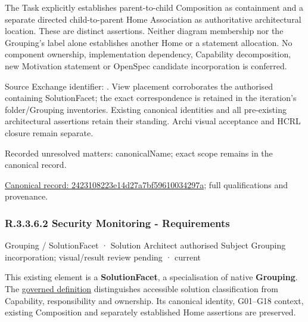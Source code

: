 The Task explicitly establishes parent-to-child Composition as containment and
a separate directed child-to-parent Home Association as authoritative architectural
location. These are distinct assertions. Neither diagram membership nor the
Grouping's label alone establishes another Home or a statement allocation.
No component ownership, implementation dependency, Capability decomposition,
new Motivation statement or OpenSpec candidate incorporation is conferred.



Source Exchange identifier: \texttt{}. View placement corroborates
the authorised containing SolutionFacet; the exact correspondence is retained in the
iteration's folder/Grouping inventories. Existing canonical identities and all
pre-existing architectural assertions retain their standing. Archi visual
acceptance and HCRL closure remain separate.


{\small Recorded unresolved matters: canonicalName; exact scope remains in the canonical record.}\par
{\footnotesize \href{../../../../../../../continuum/grouping/2423108223e14d27a7bf59610034297a.md}{Canonical record: 2423108223e14d27a7bf59610034297a}; full qualifications and provenance.}\par
\subsubsection*{R.3.3.6.2 Security Monitoring - Requirements}
\label{navigation:R.3.3.6.2}

\label{element:60fcf91dfa7445999dfa8e039d993415}
{\small Grouping / SolutionFacet · Solution Architect authorised Subject Grouping incorporation; visual/result review pending · current}\par

This existing element is a \textbf{SolutionFacet}, a specialisation of native
\textbf{Grouping}. The \href{\detokenize{../../../../../../../governance/continuum-representation.md#solutionfacet-classification--1119-candidate}}{governed definition}
distinguishes accessible solution classification from Capability, responsibility
and ownership. Its canonical identity, G01–G18 context, existing Composition
and separately established Home assertions are preserved.



